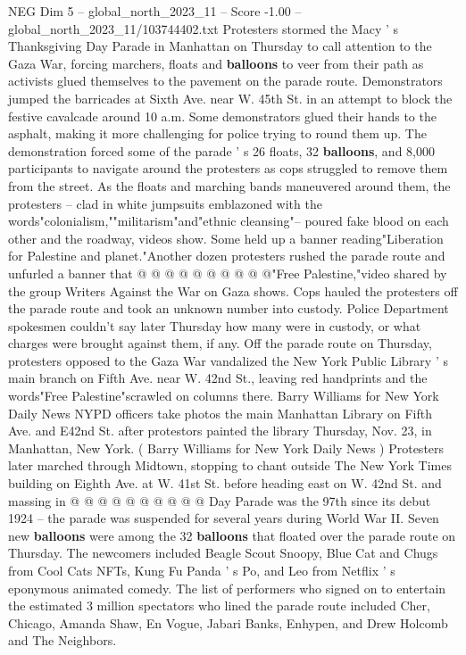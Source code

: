 \begin{textsample}{NEG Dim 5 – global\_north\_2023\_11 – Score -1.00 – global\_north\_2023\_11/103744402.txt}  \label{ex:f5_neg_043}
Protesters stormed the Macy ' s Thanksgiving Day Parade in Manhattan on Thursday to call attention to the Gaza War, forcing marchers, floats and \textbf{balloons} to veer from their path as activists glued themselves to the pavement on the parade route.
Demonstrators jumped the barricades at Sixth Ave. near W. 45th St. in an attempt to block the festive cavalcade around 10 a.m.
Some demonstrators glued their hands to the asphalt, making it more challenging for police trying to round them up.
The demonstration forced some of the parade ' s 26 floats, 32 \textbf{balloons}, and 8,000 participants to navigate around the protesters as cops struggled to remove them from the street.
As the floats and marching bands maneuvered around them, the protesters -- clad in white jumpsuits emblazoned with the words"colonialism,""militarism"and"ethnic cleansing"-- poured fake blood on each other and the roadway, videos show.
Some held up a banner reading"Liberation for Palestine and planet."Another dozen protesters rushed the parade route and unfurled a banner that @ @ @ @ @ @ @ @ @ @"Free Palestine,"video shared by the group Writers Against the War on Gaza shows.
Cops hauled the protesters off the parade route and took an unknown number into custody.
Police Department spokesmen couldn't say later Thursday how many were in custody, or what charges were brought against them, if any.
Off the parade route on Thursday, protesters opposed to the Gaza War vandalized the New York Public Library ' s main branch on Fifth Ave. near W. 42nd St., leaving red handprints and the words"Free Palestine"scrawled on columns there.
Barry Williams for New York Daily News NYPD officers take photos the main Manhattan Library on Fifth Ave. and E42nd St. after protestors painted the library Thursday, Nov. 23, in Manhattan, New York. ( Barry Williams for New York Daily News ) Protesters later marched through Midtown, stopping to chant outside The New York Times building on Eighth Ave. at W. 41st St. before heading east on W. 42nd St. and massing in @ @ @ @ @ @ @ @ @ @ Day Parade was the 97th since its debut 1924 -- the parade was suspended for several years during World War II.
Seven new \textbf{balloons} were among the 32 \textbf{balloons} that floated over the parade route on Thursday.
The newcomers included Beagle Scout Snoopy, Blue Cat and Chugs from Cool Cats NFTs, Kung Fu Panda ' s Po, and Leo from Netflix ' s eponymous animated comedy.
The list of performers who signed on to entertain the estimated 3 million spectators who lined the parade route included Cher, Chicago, Amanda Shaw, En Vogue, Jabari Banks, Enhypen, and Drew Holcomb and The Neighbors.

\end{textsample}
